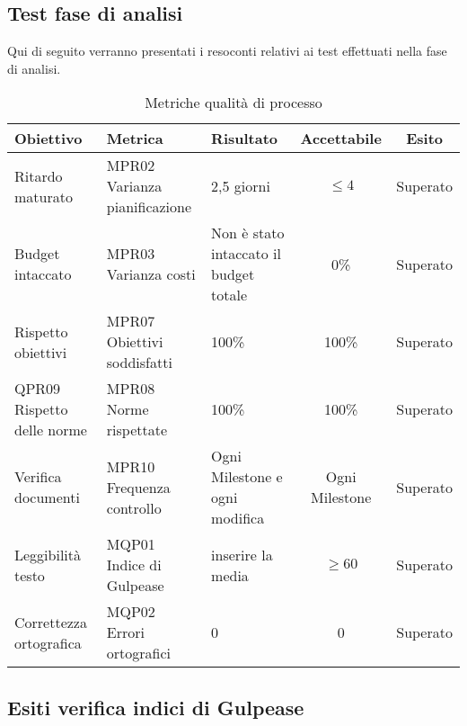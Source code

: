 \documentclass[../piano_di_qualifica.tex]{subfiles}
\begin{document}
\subsection{Test fase di analisi}
Qui di seguito verranno presentati i resoconti relativi ai test effettuati nella fase di analisi. \par

\begin{table}[!ht]
	\centering
	\begin{tabular}{|p{3.5cm}|p{3.5cm}|l|c|c|}
		\hline
		\rowcolor{lightgray}
		\textbf{Obiettivo}  & \textbf{Metrica} & \textbf{Risultato} & \textbf{Accettabile} & \textbf{Esito} \\
		\hline
		Ritardo maturato & MPR02 Varianza pianificazione  & 2,5 giorni  & \(\leq 4\) & Superato  \\
		\hline
		Budget intaccato   & MPR03 Varianza costi   &  Non è stato intaccato il budget totale    &  0\%  &  Superato\\
		\hline
		Rispetto obiettivi   & MPR07 Obiettivi soddisfatti     & 100\%   & 100\% & Superato  \\
		\hline
		QPR09 Rispetto delle norme  & MPR08 Norme rispettate   & 100\%  & 100\%   & Superato\\
		\hline
		Verifica documenti   & MPR10 Frequenza controllo    & Ogni Milestone e ogni modifica   & Ogni Milestone    & Superato \\
		\hline
		Leggibilità testo & MQP01 Indice di Gulpease  & inserire la media  & \(\ge 60\)  & Superato \\
		\hline
		Correttezza ortografica   & MQP02 Errori ortografici   &     0    &  0 & Superato  \\
		\hline
	\end{tabular}
	\caption{Metriche qualità di processo}
\end{table}


\subsection{Esiti verifica indici di Gulpease}
\label{sub:verif_gul}
\end{document}
